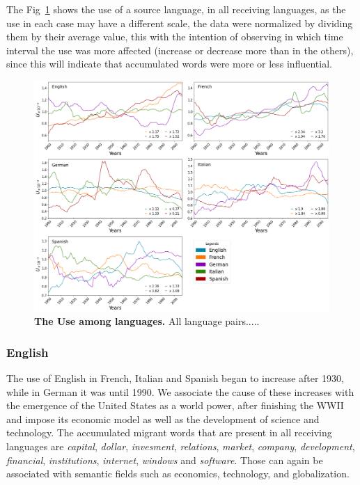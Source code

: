 \documentclass[10pt,letterpaper]{article} %
\begin{document}
	The Fig~\ref{fig.UT_art} shows the use of a source language, in all receiving languages, as the use in each case may have a different scale, the data were normalized by dividing them by their average value, this with the intention of observing in which time interval the use was more affected (increase or decrease more than in the others), since this will indicate that accumulated words were more or less influential. 
	
	
	\begin{figure}[!h]
		\begin{adjustwidth}{-6cm}{1cm}
			\centering
			\includegraphics[scale=0.38]{USO_A.png}
			\caption{{\bf The Use among languages.} All language pairs.....}
			\label{fig.UT_art}
		\end{adjustwidth}
	\end{figure}
	\subsubsection*{English} %
	
	The use of English in French, Italian and Spanish began to increase after 1930, while in German it was until 1990. We associate the cause of these increases with the emergence of the United States as a world power, after finishing the WWII and  impose its economic model as well as the development of science and technology. The accumulated migrant words that are present in all receiving  languages are \textit{capital}, \textit{dollar}, \textit{invesment}, \textit{relations}, \textit{market}, \textit{company}, \textit{development}, \textit{financial},  \textit{institutions}, \textit{internet}, \textit{windows} and \textit{software}. Those can again be associated with semantic fields such as economics, technology, and globalization.
	
\end{document}
